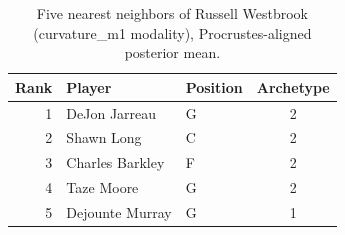 \begin{table}[htbp]
  \centering\small
  \begin{tabular}{rllc}
    \toprule
    Rank & Player & Position & Archetype \\
    \midrule
    1 & DeJon Jarreau & G & 2 \\
    2 & Shawn Long & C & 2 \\
    3 & Charles Barkley & F & 2 \\
    4 & Taze Moore & G & 2 \\
    5 & Dejounte Murray & G & 1 \\
    \bottomrule
  \end{tabular}
  \caption{Five nearest neighbors of Russell Westbrook (curvature_m1 modality), Procrustes-aligned posterior mean.}
  \label{tab:Russell_Westbrook_neighbors_curvature_m1}
\end{table}


